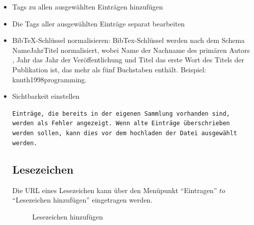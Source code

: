 \begin{itemize}
\item Tags zu allen ausgewählten Einträgen hinzufügen
\item Die Tags aller ausgewählten Einträge separat bearbeiten
\item BibTeX-Schlüssel normalisieren: BibTex-Schlüssel werden nach dem Schema NameJahrTitel normalisiert, wobei Name der Nachname des primären Autors , Jahr das Jahr der Veröffentlichung und Titel das erste Wort des Titels der Publikation ist, das mehr als fünf Buchstaben enthält. Beispiel: knuth1998programming.
\item Sichtbarkeit einstellen
\begin{mdframed}[style=achtung]\texttt{Einträge, die bereits in der eigenen Sammlung vorhanden sind, werden als Fehler angezeigt. Wenn alte Einträge überschrieben werden sollen, kann dies vor dem hochladen der Datei ausgewählt werden.} \
\end{mdframed}
\subsection{Lesezeichen} %
\label{subsec:lesezeichen}
Die URL eines Lesezeichen  kann über den Menüpunkt \enquote{Eintragen} $to$ \enquote{Lesezeichen hinzufügen} eingetragen werden. 
\begin{figure}[h!]
 \centering
 \caption{Lesezeichen hinzufügen}
 \label{fig:lesezeichenHinzufuegen}
\end{figure} 


\end{itemize}
